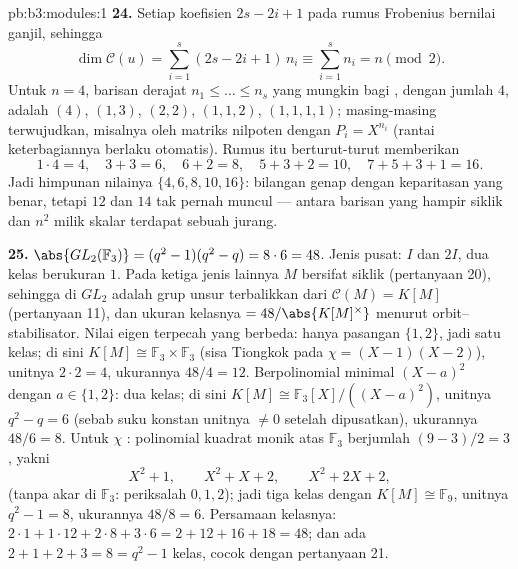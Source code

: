 \begin{solution}{pb:b3:modules:1}
\textbf{24.} Setiap koefisien $2s - 2i + 1$ pada rumus
Frobenius bernilai ganjil, sehingga
\[
\dim\mathcal C(u) = \sum_{i=1}^s(2s - 2i + 1)\,n_i
\equiv \sum_{i=1}^s n_i = n \pmod 2 .
\]
Untuk $n = 4$, barisan derajat $n_1 \leq \dots
\leq n_s$ yang mungkin bagi , dengan jumlah $4$, adalah $(4)$,
$(1, 3)$, $(2, 2)$, $(1, 1, 2)$, $(1, 1, 1, 1)$; masing-masing
terwujudkan, misalnya oleh matriks nilpoten dengan $P_i = X^{n_i}$ (rantai
keterbagiannya berlaku otomatis). Rumus itu berturut-turut memberikan
\[
1\cdot4 = 4, \quad 3 + 3 = 6, \quad 6 + 2 = 8, \quad
5 + 3 + 2 = 10, \quad 7 + 5 + 3 + 1 = 16 .
\]
Jadi himpunan nilainya $\{4, 6, 8, 10, 16\}$: bilangan genap dengan
keparitasan yang benar, tetapi $12$ dan $14$ tak pernah muncul --- antara
barisan yang hampir siklik dan $n^2$ milik skalar terdapat sebuah jurang.

\textbf{25.} $\abs{GL_2(\mathbb F_3)} = (q^2 - 1)(q^2 - q) =
8 \cdot 6 = 48$. Jenis pusat: $I$ dan $2I$, dua kelas
berukuran $1$. Pada ketiga jenis lainnya $M$ bersifat siklik (pertanyaan
20), sehingga  di $GL_2$ adalah grup unsur terbalikkan
dari $\mathcal C(M) = K[M]$ (pertanyaan 11), dan ukuran
kelasnya $=48/\abs{K[M]^\times}$ menurut orbit--stabilisator. Nilai eigen
terpecah yang berbeda: hanya pasangan $\{1, 2\}$, jadi satu kelas; di sini $K[M]
\cong \mathbb F_3 \times \mathbb F_3$ (sisa Tiongkok pada $\chi = (X-1)
(X-2)$), unitnya $2 \cdot 2 = 4$, ukurannya $48/4 = 12$. Berpolinomial minimal
$(X - a)^2$ dengan $a \in \{1, 2\}$: dua kelas; di sini $K[M] \cong
\mathbb F_3[X]/((X-a)^2)$, unitnya $q^2 - q = 6$ (sebab suku konstan
unitnya $\neq 0$ setelah dipusatkan), ukurannya $48/6 = 8$.
Untuk $\chi$ : polinomial kuadrat monik  atas
$\mathbb F_3$ berjumlah $(9 - 3)/2 = 3$, yakni
\[
X^2 + 1, \qquad X^2 + X + 2, \qquad X^2 + 2X + 2,
\]
(tanpa akar di $\mathbb F_3$: periksalah $0, 1, 2$); jadi tiga kelas dengan
$K[M] \cong \mathbb F_9$, unitnya $q^2 - 1 = 8$, ukurannya $48/8 =
6$. Persamaan kelasnya: $2\cdot1 + 1\cdot12 + 2\cdot8 + 3\cdot6 =
2 + 12 + 16 + 18 = 48$; dan ada $2 + 1 + 2 + 3 = 8 = q^2 - 1$
kelas, cocok dengan pertanyaan 21.

\end{solution}
